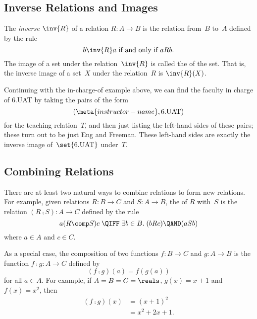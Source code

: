 \subsection{Inverse Relations and Images}

\begin{definition}\label{def:inverse}
The \emph{inverse} $\inv{R}$ of a relation $R: A \to B$ is the
relation from~$B$ to~$A$ defined by the rule
\begin{equation*}
    b \inv{R} a \text{ if and only if } a R b.
\end{equation*}
The image of a set under the relation~$\inv{R}$ is called the
 of the set.  That is, the inverse image of a
set~$X$ under the relation~$R$ is $\inv{R}(X)$.
\end{definition}

Continuing with the in-charge-of example above, we can find the
faculty in charge of 6.UAT by taking the pairs of the form
\begin{equation*}
    (\meta{instructor-name}, \text{6.UAT})
\end{equation*}
for the teaching relation~$T$, and then just listing the left-hand
sides of these pairs; these turn out to be just Eng and Freeman.
These left-hand sides are exactly the inverse image
of~$\set{\text{6.UAT}}$ under~$T$.

\subsection{Combining Relations}\label{subsec:combine-rel}

There are at least two natural ways to combine relations to form new
relations.  For example, given relations $R : B \to C$ and $S : A \to
B$, the  of $R$ with~$S$ is the relation $(R \comp
S) : A \to C$ defined by the rule
\begin{equation*}
    a (R \comp S) c \;\QIFF\; \exists b \in B. \; (b R c) \QAND (a S b)
\end{equation*}
where $a \in A$ and $c \in C$.

As a special case, the composition of two functions $f: B \to C$ and
$g: A \to B$ is the function $f \comp g : A \to C$ defined by
\begin{equation*}
    (f \comp g)(a) = f(g(a))
\end{equation*}
for all $a \in A$.  For example, if $A = B = C = \reals$, $g(x) = x +
1$ and $f(x) = x^2$, then
\begin{align*}
    (f \comp g)(x) &= (x + 1)^2 \\
                   &= x^2 + 2x + 1.
\end{align*}

